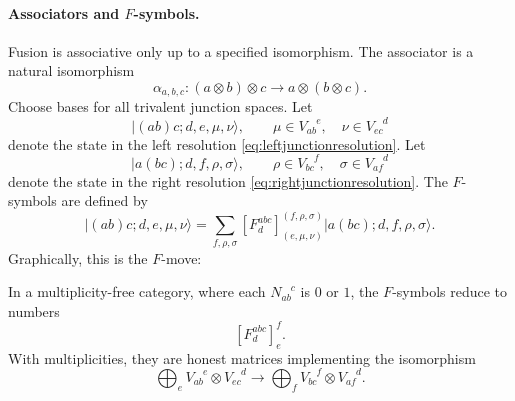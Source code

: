 \documentclass[11pt]{article}
\begin{document}
\paragraph{Associators and $F$-symbols.}
Fusion is associative only up to a specified isomorphism.  The associator is a natural isomorphism
\begin{equation}
  \alpha_{a,b,c}: (a\otimes b)\otimes c\longrightarrow a\otimes(b\otimes c) .
\end{equation}
Choose bases for all trivalent junction spaces.  Let
\begin{equation}
  \bigl|(ab)c;d,e,\mu,\nu\bigr\rangle,
  \qquad
  \mu\in V_{ab}^{\phantom{ab}e},
  \quad
  \nu\in V_{ec}^{\phantom{ec}d}
\end{equation}
denote the state in the left resolution \eqref{eq:leftjunctionresolution}.  Let
\begin{equation}
  \bigl|a(bc);d,f,\rho,\sigma\bigr\rangle,
  \qquad
  \rho\in V_{bc}^{\phantom{bc}f},
  \quad
  \sigma\in V_{af}^{\phantom{af}d}
\end{equation}
denote the state in the right resolution \eqref{eq:rightjunctionresolution}.  The $F$-symbols are defined by
\begin{equation}
  \bigl|(ab)c;d,e,\mu,\nu\bigr\rangle
  =
  \sum_{f,\rho,\sigma}
  \left[F^{abc}_{d}\right]_{(e,\mu,\nu)}^{(f,\rho,\sigma)}
  \bigl|a(bc);d,f,\rho,\sigma\bigr\rangle .
  \label{eq:Fsymbols}
\end{equation}
Graphically, this is the $F$-move:
\begin{center}
\end{center}
In a multiplicity-free category, where each $N_{ab}^{\phantom{ab}c}$ is $0$ or $1$, the $F$-symbols reduce to numbers
\begin{equation}
  \left[F^{abc}_{d}\right]_{e}^{f} .
\end{equation}
With multiplicities, they are honest matrices implementing the isomorphism
\begin{equation}
  \bigoplus_e V_{ab}^{\phantom{ab}e}\otimes V_{ec}^{\phantom{ec}d}
  \longrightarrow
  \bigoplus_f V_{bc}^{\phantom{bc}f}\otimes V_{af}^{\phantom{af}d} .
  \label{eq:Fasamatrix}
\end{equation}
\end{document}
